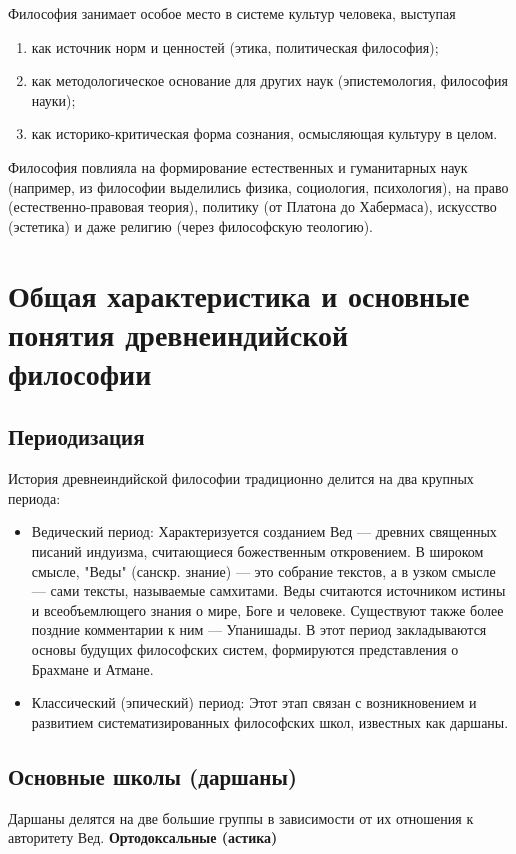 \documentclass[12pt,a4paper]{article}
\begin{document}
	Философия занимает особое место в системе культур человека, выступая
	\begin{enumerate}
		\item как источник норм и ценностей (этика, политическая философия);
		\item как методологическое основание для других наук (эпистемология, философия науки);
		\item как историко-критическая форма сознания, осмысляющая культуру в целом.
	\end{enumerate}
	Философия повлияла на формирование естественных и гуманитарных наук (например, из философии выделились физика, социология, психология), на право (естественно-правовая теория), политику (от Платона до Хабермаса), искусство (эстетика) и даже религию (через философскую теологию).
	
	
	
	\section{Общая характеристика и основные понятия древнеиндийской философии~\checkmark}
	
	\subsection{Периодизация}
	История древнеиндийской философии традиционно делится на два крупных периода:
	\begin{itemize}
		\item Ведический период: Характеризуется созданием Вед --- древних священных писаний индуизма, считающиеся божественным откровением. В широком смысле, "Веды" (санскр. знание) — это собрание текстов, а в узком смысле — сами тексты, называемые самхитами. Веды считаются источником истины и всеобъемлющего знания о мире, Боге и человеке. Существуют также более поздние комментарии к ним — Упанишады.
		В этот период закладываются основы будущих философских систем, формируются представления о Брахмане и Атмане.
		\item Классический (эпический) период: Этот этап связан с возникновением и развитием систематизированных философских школ, известных как даршаны.
	\end{itemize}
	
	
	\subsection{Основные школы (даршаны)} Даршаны делятся на две большие группы в зависимости от их отношения к авторитету Вед.
	\textbf{Ортодоксальные (астика)}
	
\end{document}
